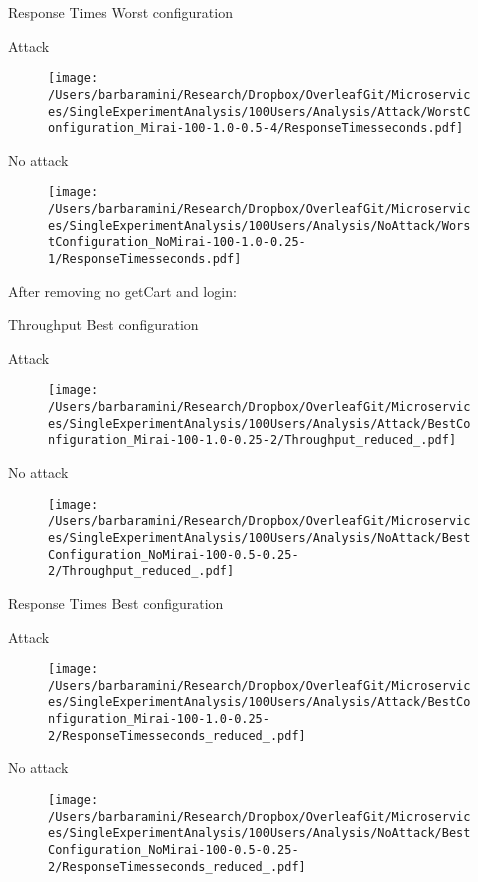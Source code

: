 \documentclass[10pt]{article}
\begin{document}
\break
Response Times Worst configuration \par
Attack 

\begin{figure}[h]
\texttt{[image: /Users/barbaramini/Research/Dropbox/OverleafGit/Microservices/SingleExperimentAnalysis/100Users/Analysis/Attack/WorstConfiguration\_Mirai-100-1.0-0.5-4/ResponseTimesseconds.pdf]}
\end{figure}
No attack
\begin{figure}[h]
\texttt{[image: /Users/barbaramini/Research/Dropbox/OverleafGit/Microservices/SingleExperimentAnalysis/100Users/Analysis/NoAttack/WorstConfiguration\_NoMirai-100-1.0-0.25-1/ResponseTimesseconds.pdf]}
\end{figure}

\break
After removing no getCart and login:\par

Throughput Best configuration \par
Attack \par
\begin{figure}[h]
\texttt{[image: /Users/barbaramini/Research/Dropbox/OverleafGit/Microservices/SingleExperimentAnalysis/100Users/Analysis/Attack/BestConfiguration\_Mirai-100-1.0-0.25-2/Throughput\_reduced\_.pdf]}
\end{figure}
No attack 
\begin{figure}[h]
\texttt{[image: /Users/barbaramini/Research/Dropbox/OverleafGit/Microservices/SingleExperimentAnalysis/100Users/Analysis/NoAttack/BestConfiguration\_NoMirai-100-0.5-0.25-2/Throughput\_reduced\_.pdf]}
\end{figure}

\break
Response Times Best configuration \par
Attack\par
\begin{figure}[h]
\texttt{[image: /Users/barbaramini/Research/Dropbox/OverleafGit/Microservices/SingleExperimentAnalysis/100Users/Analysis/Attack/BestConfiguration\_Mirai-100-1.0-0.25-2/ResponseTimesseconds\_reduced\_.pdf]}
\end{figure}
No attack
\begin{figure}[h]
\texttt{[image: /Users/barbaramini/Research/Dropbox/OverleafGit/Microservices/SingleExperimentAnalysis/100Users/Analysis/NoAttack/BestConfiguration\_NoMirai-100-0.5-0.25-2/ResponseTimesseconds\_reduced\_.pdf]}
\end{figure}
\end{document}
